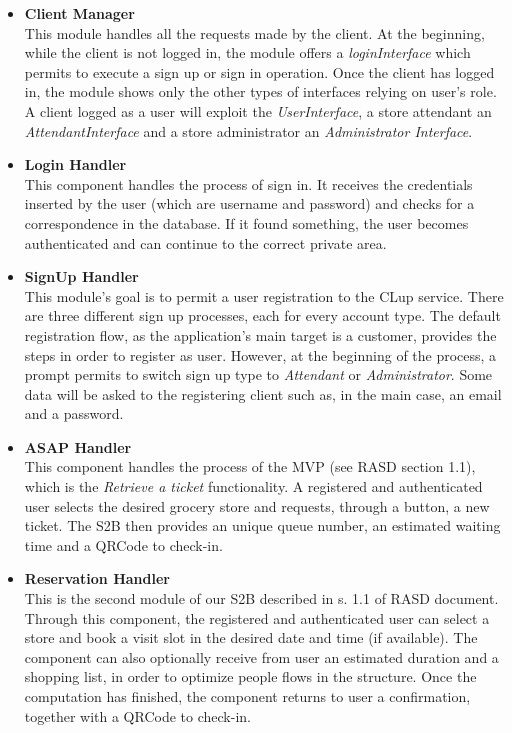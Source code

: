 \documentclass[table, 12pt]{article}
\begin{document}
\begin{itemize}
    \item \textbf{Client Manager}\\This module handles all the requests made by the client. At the beginning, while the client is not logged in, the module offers a \textit{loginInterface} which permits to execute a sign up or sign in operation. Once the client has logged in, the module shows only the other types of interfaces relying on user's role. A client logged as a user will exploit the \textit{UserInterface}, a store attendant an \textit{AttendantInterface} and a store administrator an \textit{Administrator Interface}.
    \item \textbf{Login Handler}\\This component handles the process of sign in. It receives the credentials inserted by the user (which are username and password) and checks for a correspondence in the database. If it found something, the user becomes authenticated and can continue to the correct private area.
    \item \textbf{SignUp Handler}\\This module's goal is to permit a user registration to the CLup service. There are three different sign up processes, each for every account type. The default registration flow, as the application's main target is a customer, provides the steps in order to register as user. However, at the beginning of the process, a prompt permits to switch sign up type to \textit{Attendant} or \textit{Administrator}. Some data will be asked to the registering client such as, in the main case, an email and a password.
    \item \textbf{ASAP Handler}\\This component handles the process of the MVP (see RASD section 1.1), which is the \textit{Retrieve a ticket} functionality. A registered and authenticated user selects the desired grocery store and requests, through a button, a new ticket. The S2B then provides an unique queue number, an estimated waiting time and a QRCode to check-in.
    \item \textbf{Reservation Handler}\\This is the second module of our S2B described in s. 1.1 of RASD document. Through this component, the registered and authenticated user can select a store and book a visit slot in the desired date and time (if available). The component can also optionally receive from user an estimated duration and a shopping list, in order to optimize people flows in the structure. Once the computation has finished, the component returns to user a confirmation, together with a QRCode to check-in.

\end{itemize}
\end{document}
